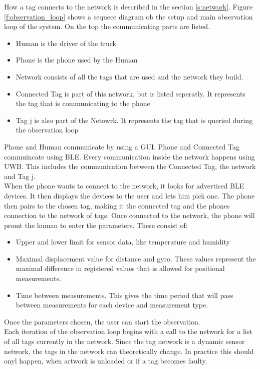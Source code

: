 How a tag connects to the network is described in the section \ref{s:network}.
Figure \ref{f:observation_loop} shows a sequece diagram ob the setup and main observation loop of the system.
On the top the communicating parts are listed.
\begin{itemize}
	\item Human is the driver of the truck
	\item Phone is the phone used by the Human
	\item Network consists of all the tags that are used and the network they build.
	\item Connected Tag is part of this network, but is listed seperatly. It represents the tag that is communicating to the phone
	\item Tag j is also part of the Netowrk. It represents the tag that is queried during the observation loop
\end{itemize}
Phone and Human communicate by using a GUI. Phone and Connected Tag commuincate using BLE. Every communication inside the network happens using UWB. This includes the communication between the Connected Tag, the network and Tag j. \\
When the phone wants to connect to the network, it looks for advertised BLE devices.
It then displays the devices to the user and lets him pick one.
The phone then pairs to the chosen tag, making it the connected tag and the phones connection to the network of tags.
Once connected to the network, the phone will promt the human to enter the parameters.
These consist of:
\begin{itemize}
	\item Upper and lower limit for sensor data, like temperature and humidity
	\item Maximal displacement value for distance and gyro. These values represent the maximal difference in registered values that is allowed for positional measurements.
	\item Time between measurements. This gives the time period that will pass between measurements for each device and measurement type.
\end{itemize}
Once the parameters chosen, the user can start the observation.\\
Each iteration of the observation loop begins with a call to the network for a list of all tags currently in the network.
Since the tag network is a dynamic sensor network, the tags in the network can theoretically change. 
In practice this should onyl happen, when artwork is unloaded or if a tag becomes faulty.
